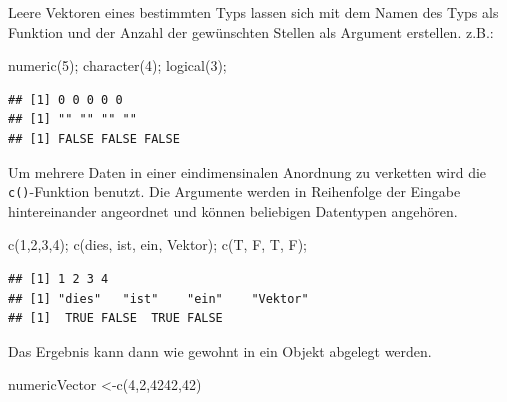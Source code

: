 \documentclass[
]{book}
\newenvironment{Shaded}{\begin{snugshade}}{\end{snugshade}}
\newcommand{\DecValTok}[1]{\textcolor[rgb]{0.00,0.00,0.81}{#1}}
\newcommand{\FunctionTok}[1]{\textcolor[rgb]{0.00,0.00,0.00}{#1}}
\newcommand{\NormalTok}[1]{#1}
\newcommand{\OtherTok}[1]{\textcolor[rgb]{0.56,0.35,0.01}{#1}}
\newcommand{\StringTok}[1]{\textcolor[rgb]{0.31,0.60,0.02}{#1}}
\begin{document}
Leere Vektoren eines bestimmten Typs lassen sich mit dem Namen des Typs als Funktion und der Anzahl der gewünschten Stellen als Argument erstellen. z.B.:

\begin{Shaded}
\begin{Highlighting}[]
\FunctionTok{numeric}\NormalTok{(}\DecValTok{5}\NormalTok{);}
\FunctionTok{character}\NormalTok{(}\DecValTok{4}\NormalTok{);}
\FunctionTok{logical}\NormalTok{(}\DecValTok{3}\NormalTok{);}
\end{Highlighting}
\end{Shaded}

\begin{verbatim}
## [1] 0 0 0 0 0
## [1] "" "" "" ""
## [1] FALSE FALSE FALSE
\end{verbatim}

Um mehrere Daten in einer eindimensinalen Anordnung zu verketten wird die \texttt{c()}-Funktion benutzt.
Die Argumente werden in Reihenfolge der Eingabe hintereinander angeordnet und können beliebigen Datentypen angehören.

\begin{Shaded}
\begin{Highlighting}[]
\FunctionTok{c}\NormalTok{(}\DecValTok{1}\NormalTok{,}\DecValTok{2}\NormalTok{,}\DecValTok{3}\NormalTok{,}\DecValTok{4}\NormalTok{);}
\FunctionTok{c}\NormalTok{(}\StringTok{\textquotesingle{}dies\textquotesingle{}}\NormalTok{, }\StringTok{\textquotesingle{}ist\textquotesingle{}}\NormalTok{, }\StringTok{\textquotesingle{}ein\textquotesingle{}}\NormalTok{, }\StringTok{\textquotesingle{}Vektor\textquotesingle{}}\NormalTok{);}
\FunctionTok{c}\NormalTok{(T, F, T, F);}
\end{Highlighting}
\end{Shaded}

\begin{verbatim}
## [1] 1 2 3 4
## [1] "dies"   "ist"    "ein"    "Vektor"
## [1]  TRUE FALSE  TRUE FALSE
\end{verbatim}

Das Ergebnis kann dann wie gewohnt in ein Objekt abgelegt werden.

\begin{Shaded}
\begin{Highlighting}[]
\NormalTok{numericVector }\OtherTok{\textless{}{-}}\FunctionTok{c}\NormalTok{(}\DecValTok{4}\NormalTok{,}\DecValTok{2}\NormalTok{,}\DecValTok{4242}\NormalTok{,}\DecValTok{42}\NormalTok{)}
\end{Highlighting}
\end{Shaded}
\end{document}
